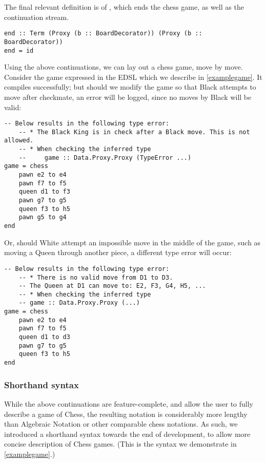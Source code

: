 The final relevant definition is of , which ends the chess game, as well as the continuation stream.

\begin{lstlisting}
end :: Term (Proxy (b :: BoardDecorator)) (Proxy (b :: BoardDecorator))
end = id
\end{lstlisting}

Using the above continuations, we can lay out a chess game, move by move. Consider the game expressed in the EDSL which we describe in \cref{examplegame}. It compiles successfully; but should we modify the game so that Black attempts to move after checkmate, an error will be logged, since no moves by Black will be valid:

\begin{lstlisting}
-- Below results in the following type error:
    -- * The Black King is in check after a Black move. This is not allowed.
    -- * When checking the inferred type
    --     game :: Data.Proxy.Proxy (TypeError ...)
game = chess
    pawn e2 to e4
    pawn f7 to f5
    queen d1 to f3
    pawn g7 to g5
    queen f3 to h5
    pawn g5 to g4
end
\end{lstlisting}

Or, should White attempt an impossible move in the middle of the game, such as moving a Queen through another piece, a different type error will occur:

\begin{lstlisting}
-- Below results in the following type error:
    -- * There is no valid move from D1 to D3.
    -- The Queen at D1 can move to: E2, F3, G4, H5, ...
    -- * When checking the inferred type
    -- game :: Data.Proxy.Proxy (...)
game = chess
    pawn e2 to e4
    pawn f7 to f5
    queen d1 to d3
    pawn g7 to g5
    queen f3 to h5
end
\end{lstlisting}

\subsubsection{Shorthand syntax} \label{shorthandexplanation}

While the above continuations are feature-complete, and allow the user to fully describe a game of Chess, the resulting notation is considerably more lengthy than Algebraic Notation or other comparable chess notations. As such, we introduced a shorthand syntax towards the end of development, to allow more concise description of Chess games. (This is the syntax we demonstrate in \cref{examplegame}.)

